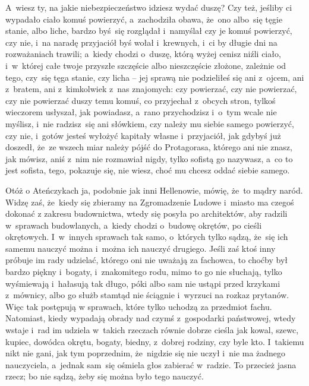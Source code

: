 
\noi A~wiesz ty, na jakie niebezpieczeństwo idziesz wydać duszę? Czy
też, jeśliby ci wypadało ciało komuś powierzyć, a~zachodziła obawa,
że~ono albo~się tęgie stanie, albo liche, bardzo byś~się rozglądał
i~namyślał czy je komuś powierzyć, czy nie, i~na naradę przyjaciół byś
wołał i~krewnych, i~ci by długie dni na rozważaniach trawili; a~kiedy
chodzi o~duszę, którą wyżej cenisz niźli ciało, i~w~której całe twoje
przyszłe szczęście albo nieszczęście złożone, zależnie od tego,
czy~się tęga stanie, czy licha -- jej sprawą nie podzieliłeś się ani
z~ojcem, ani z~bratem, ani z~kimkolwiek z~nas znajomych: czy
powierzać, czy nie powierzać, czy nie powierzać duszy temu komuś, co
przyjechał z~obcych stron, tylkoś wieczorem usłyszał, jak powiadasz,
a~rano przychodzisz i~o~tym wcale nie myślisz, i~nie radzisz~się ani
słówkiem, czy należy mu siebie samego powierzyć, czy nie, i~gotów
jesteś wyłożyć kapitały własne i~przyjaciół, jak gdybyś już doszedł,
że~ze wszech miar należy pójść do Protagorasa, którego ani nie znasz,
jak mówisz, aniś z~nim nie rozmawiał nigdy, tylko sofistą go nazywasz,
a~co to jest sofista, tego, pokazuje się, nie wiesz, choć mu chcesz
oddać siebie samego.



\noi Otóż o Ateńczykach ja, podobnie jak inni Hellenowie, mówię, że~to
mądry naród. Widzę zaś, że~kiedy się zbieramy na Zgromadzenie Ludowe
i~miasto ma czegoś dokonać z zakresu budownictwa, wtedy się posyła po
architektów, aby radzili w~sprawach budowlanych, a~kiedy chodzi
o~budowę okrętów, po cieśli okrętowych. I~w~innych sprawach tak samo,
o~których tylko sądzą, że~się ich samemu nauczyć można i~można ich
nauczyć drugiego. Jeśli zaś ktoś inny próbuje im rady udzielać,
którego oni nie uważają za fachowca, to choćby był bardzo piękny
i~bogaty, i~znakomitego rodu, mimo to go nie słuchają, tylko
wyśmiewają i~hałasują tak długo, póki albo sam nie ustąpi przed
krzykami z~mównicy, albo go służb stamtąd nie ściągnie i~wyrzuci na
rozkaz prytanów. Więc tak postępują w sprawach, które tylko uchodzą za
przedmiot fachu. Natomiast, kiedy wypadają obrady nad czymś
z~gospodarki państwowej, wtedy wstaje i~rad im udziela w~takich
rzeczach równie dobrze cieśla jak kowal, szewc, kupiec, dowódca
okrętu, bogaty, biedny, z~dobrej rodziny, czy byle kto. I~takiemu nikt
nie gani, jak tym poprzednim, że~nigdzie się nie uczył i~nie ma
żadnego nauczyciela, a~jednak sam~się ośmiela głos zabierać
w~radzie. To przecież jasna rzecz; bo nie sądzą, żeby się można było
tego nauczyć.

